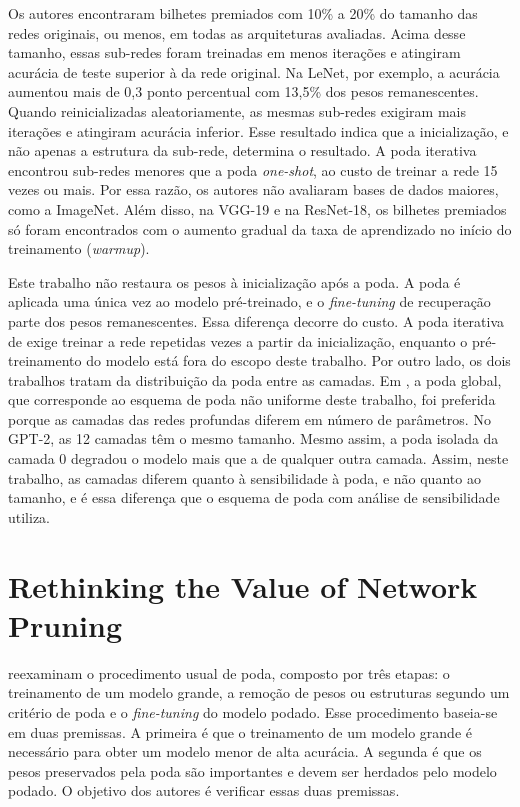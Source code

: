 Os autores encontraram bilhetes premiados com 10\% a 20\% do tamanho das redes originais, ou
menos, em todas as arquiteturas avaliadas. Acima desse tamanho, essas sub-redes foram treinadas
em menos iterações e atingiram acurácia de teste superior à da rede original. Na LeNet, por
exemplo, a acurácia aumentou mais de 0,3 ponto percentual com 13,5\% dos pesos remanescentes.
Quando reinicializadas aleatoriamente, as mesmas sub-redes exigiram mais iterações e atingiram
acurácia inferior. Esse resultado indica que a inicialização, e não apenas a estrutura da
sub-rede, determina o resultado. A poda iterativa encontrou sub-redes menores que a poda
\textit{one-shot}, ao custo de treinar a rede 15 vezes ou mais. Por essa razão, os autores não
avaliaram bases de dados maiores, como a ImageNet. Além disso, na VGG-19 e na ResNet-18, os
bilhetes premiados só foram encontrados com o aumento gradual da taxa de aprendizado no início
do treinamento (\textit{warmup}).

Este trabalho não restaura os pesos à inicialização após a poda. A poda é aplicada uma única vez
ao modelo pré-treinado, e o \textit{fine-tuning} de recuperação parte dos pesos remanescentes.
Essa diferença decorre do custo. A poda iterativa de
 exige treinar a rede repetidas vezes a partir da inicialização,
enquanto o pré-treinamento do modelo está fora do escopo deste trabalho.
Por outro lado, os dois trabalhos tratam da
distribuição da poda entre as camadas. Em , a poda global, que
corresponde ao esquema de poda não uniforme deste trabalho, foi preferida porque as camadas das
redes profundas diferem em número de parâmetros. No GPT-2, as 12 camadas têm o mesmo tamanho.
Mesmo assim, a poda isolada da camada 0 degradou o modelo mais que a de qualquer outra camada.
Assim, neste trabalho, as camadas
diferem quanto à sensibilidade à poda, e não quanto ao tamanho, e é essa diferença que o esquema
de poda com análise de sensibilidade utiliza.

\section{Rethinking the Value of Network Pruning}\label{sec:liu2019}

 reexaminam o procedimento usual de poda, composto por três etapas: o
treinamento de um modelo grande, a remoção de pesos ou estruturas segundo um critério de poda e
o \textit{fine-tuning} do modelo podado. Esse procedimento baseia-se em duas premissas. A primeira é que o treinamento de
um modelo grande é necessário para obter um modelo menor de alta acurácia. A segunda é que os
pesos preservados pela poda são importantes e devem ser herdados pelo modelo podado. O objetivo
dos autores é verificar essas duas premissas.

